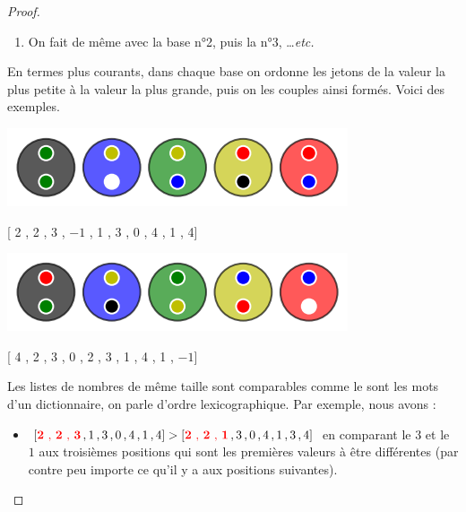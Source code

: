 \begin{proof}
\begin{enumerate}
		\item On fait de même avec la base n°2, puis la n°3, \dots \textit{etc.}
	\end{enumerate}
	
	En termes plus courants, dans chaque base on ordonne les jetons de la valeur la plus petite à la valeur la plus grande, puis on  les couples  ainsi formés. Voici des exemples.

	\vspace{-0.4em}
	\begin{center}   %
		\includegraphics[scale= 0.45]{content/algo_bubble/modelization/example_a.png}
		
		[{\color{black} 2 , 2} , {\color{blue} 3 , $-1$} , {\color{ForestGreen} 1 , 3} , {\color{Goldenrod} 0 , 4} , {\color{red} 1 , 4}]


		\medskip     %
		
		\includegraphics[scale= 0.45]{content/algo_bubble/modelization/example_b.png}
		
		[{\color{black} 4 , 2} , {\color{blue} 3 , 0} , {\color{ForestGreen} 2 , 3} , {\color{Goldenrod} 1 , 4} , {\color{red} 1 , $-1$}]
	\end{center}

	Les listes de nombres de même taille sont comparables comme le sont les mots d'un dictionnaire, on parle d'ordre lexicographique. Par exemple, nous avons :
	
	\medskip
	
	\begin{itemize}
		\item[\textbullet] $[\text{\color{red} \textbf{2} , \textbf{2} , \textbf{3}} \, , 1 \, , 3 \, , 0 \, , 4 \, , 1 \, , 4] > [\text{\color{red} \textbf{2} , \textbf{2} , \textbf{1}} \, , 3 \, , 0 \, , 4 \, , 1 \, , 3 \, , 4]$
		en comparant le $3$ et le $1$ aux troisièmes positions qui sont les premières valeurs à être différentes (par contre peu importe ce qu'il y a aux positions suivantes).


\end{itemize}
\end{proof}
